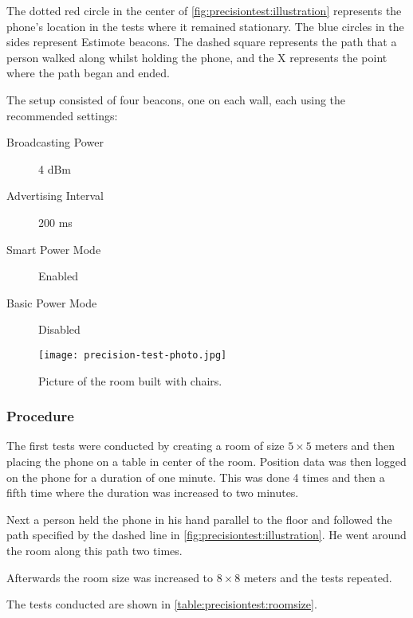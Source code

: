 The dotted red circle in the center of \cref{fig:precisiontest:illustration} represents the phone's location in the tests where it remained stationary.
The blue circles in the sides represent Estimote beacons.
The dashed square represents the path that a person walked along whilst holding the phone, and the X represents the point where the path began and ended.

The setup consisted of four beacons, one on each wall, each using the recommended settings\cite{estimote:settings}:
\begin{description}
    \item[Broadcasting Power]{4 dBm}
    \item[Advertising Interval]{200 ms}
    \item[Smart Power Mode]{Enabled}
    \item[Basic Power Mode]{Disabled}
\end{description}

\begin{figure}[!htb]
    \centering
    \texttt{[image: precision-test-photo.jpg]}
    \caption{Picture of the room built with chairs.}
\label{fig:precisiontest:chairs}
\end{figure}

\subsubsection*{Procedure}
The first tests were conducted by creating a room of size $5\times 5$ meters and then placing the phone on a table in center of the room.
Position data was then logged on the phone for a duration of one minute.
This was done 4 times and then a fifth time where the duration was increased to two minutes.

Next a person held the phone in his hand parallel to the floor and followed the path specified by the dashed line in \cref{fig:precisiontest:illustration}. He went around the room along this path two times.

Afterwards the room size was increased to $8\times 8$ meters and the tests repeated.

The tests conducted are shown in \cref{table:precisiontest:roomsize}.

